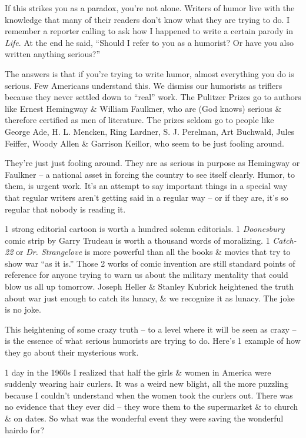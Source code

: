 \documentclass{article}
\numberwithin{equation}{section}
\begin{document}
If this strikes you as a paradox, you're not alone. Writers of humor live with the knowledge that many of their readers don't know what they are trying to do. I remember a reporter calling to ask how I happened to write a certain parody in \textit{Life}. At the end he said, ``Should I refer to you as a humorist? Or have you also written anything serious?''

The answers is that if you're trying to write humor, almost everything you do is serious. Few Americans understand this. We dismiss our humorists as triflers because they never settled down to ``real'' work. The Pulitzer Prizes go to authors like Ernest Hemingway \& William Faulkner, who are (God knows) serious \& therefore certified as men of literature. The prizes seldom go to people like George Ade, H. L. Mencken, Ring Lardner, S. J. Perelman, Art Buchwald, Jules Feiffer, Woody Allen \& Garrison Keillor, who seem to be just fooling around.

They're just just fooling around. They are as serious in purpose as Hemingway or Faulkner -- a national asset in forcing the country to see itself clearly. Humor, to them, is urgent work. It's an attempt to say important things in a special way that regular writers aren't getting said in a regular way -- or if they are, it's so regular that nobody is reading it.

1 strong editorial cartoon is worth a hundred solemn editorials. 1 \textit{Doonesbury} comic strip by Garry Trudeau is worth a thousand words of moralizing. 1 \textit{Catch-22} or \textit{Dr. Strangelove} is more powerful than all the books \& movies that try to show war ``as it is.'' Those 2 works of comic invention are still standard points of reference for anyone trying to warn us about the military mentality that could blow us all up tomorrow. Joseph Heller \& Stanley Kubrick heightened the truth about war just enough to catch its lunacy, \& we recognize it as lunacy. The joke is no joke.

This heightening of some crazy truth -- to a level where it will be seen as crazy -- is the essence of what serious humorists are trying to do. Here's 1 example of how they go about their mysterious work.

1 day in the 1960s I realized that half the girls \& women in America were suddenly wearing hair curlers. It was a weird new blight, all the more puzzling because I couldn't understand when the women took the curlers out. There was no evidence that they ever did -- they wore them to the supermarket \& to church \& on dates. So what was the wonderful event they were saving the wonderful hairdo for?
\end{document}
